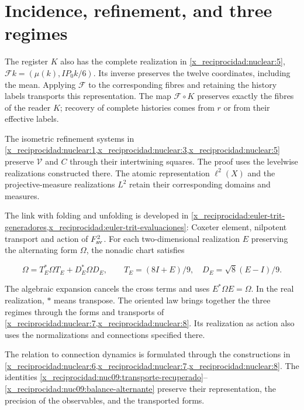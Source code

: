 \section{Incidence, refinement, and three regimes}

The register \(K\) also has the complete realization in \cref{x_reciprocidad:nuclear:5}, \(\mathcal Fk=(\mu(k),IP_0k/6)\). Its inverse preserves the twelve coordinates, including the mean. Applying \(\mathcal F\) to the corresponding fibres and retaining the history labels transports this representation. The map \(\mathcal F\circ K\) preserves exactly the fibres of the reader \(K\); recovery of complete histories comes from \(r\) or from their effective labels.

The isometric refinement systems in \cref{x_reciprocidad:nuclear:1,x_reciprocidad:nuclear:3,x_reciprocidad:nuclear:5} preserve \(\mathcal V\) and \(C\) through their intertwining squares. The proof uses the levelwise realizations constructed there. The atomic representation \(\ell^2(X)\) and the projective-measure realizations \(L^2\) retain their corresponding domains and measures.

The link with folding and unfolding is developed in
\cref{x_reciprocidad:euler-trit-generadores,x_reciprocidad:euler-trit-evaluaciones}:
Coxeter element, nilpotent transport and action of \(F_{\rm av}^2\).
For each two-dimensional realization \(E\) preserving the alternating
form \(\Omega\), the nonadic chart satisfies



\begin{equation}
\Omega=T_E^*\Omega T_E+D_E^*\Omega D_E,
\qquad T_E=(8I+E)/9,\quad D_E=\sqrt8(E-I)/9.
\label{x_reciprocidad:nuc09:balance-alternante}
\end{equation}



The algebraic expansion cancels the cross terms and uses \(E^*\Omega E=\Omega\). In the real realization, \(*\) means transpose. The oriented law brings together the three regimes through the forms and transports of \cref{x_reciprocidad:nuclear:7,x_reciprocidad:nuclear:8}. Its realization as action also uses the normalizations and connections specified there.

The relation to connection dynamics is formulated through the constructions in \cref{x_reciprocidad:nuclear:6,x_reciprocidad:nuclear:7,x_reciprocidad:nuclear:8}. The identities \eqref{x_reciprocidad:nuc09:transporte-recuperado}--\eqref{x_reciprocidad:nuc09:balance-alternante} preserve their representation, the precision of the observables, and the transported forms.
